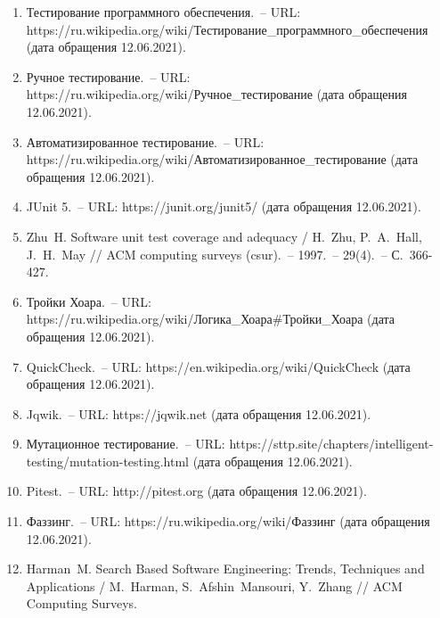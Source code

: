 \begin{enumerate}

\item Тестирование программного обеспечения.~-- URL: \\ https://ru.wikipedia.org/wiki/Тестирование\_программного\_обеспечения (дата обращения 12.06.2021).
	
\item Ручное тестирование.~-- URL: \\ https://ru.wikipedia.org/wiki/Ручное\_тестирование (дата обращения 12.06.2021).

\item Автоматизированное тестирование.~-- URL:  \\ https://ru.wikipedia.org/wiki/Автоматизированное\_тестирование (дата обращения 12.06.2021).

\item JUnit 5.~-- URL: https://junit.org/junit5/ (дата обращения 12.06.2021).

\item Zhu~H. Software unit test coverage and adequacy / H.~Zhu,  P.~A.~Hall, J.~H.~May //  ACM computing surveys (csur).~-- 1997.~-- 29(4).~-- С.~366-427.

\item Тройки Хоара.~-- URL: \\ https://ru.wikipedia.org/wiki/Логика\_Хоара#Тройки\_Хоара (дата обращения 12.06.2021).

\item QuickCheck.~-- URL: https://en.wikipedia.org/wiki/QuickCheck (дата обращения 12.06.2021).

\item Jqwik.~-- URL: https://jqwik.net (дата обращения 12.06.2021).

\item Мутационное тестирование.~-- URL:  https://sttp.site/chapters/intelligent-testing/mutation-testing.html (дата обращения 12.06.2021).

\item Pitest.~-- URL: http://pitest.org (дата обращения 12.06.2021).

\item Фаззинг.~-- URL: https://ru.wikipedia.org/wiki/Фаззинг (дата обращения 12.06.2021).

\item Harman~M. Search Based Software Engineering: Trends, Techniques and Applications / M.~Harman, S.~Afshin~Mansouri, Y.~Zhang // ACM Computing Surveys.


\end{enumerate}
